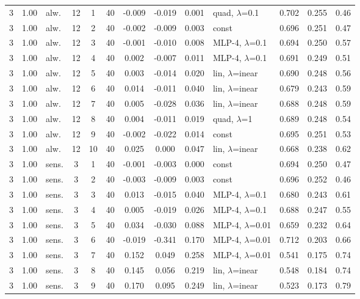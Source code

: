 \documentclass[10pt]{article}
\begin{document}
\begin{scriptsize}
\begin{longtable}{cclcc c ccc l ccc}
3 & 1.00 & alw. & 12 & 1 & 40 & -0.009 & -0.019 & 0.001 & quad, $\lambda$=0.1 & 0.702 & 0.255 & 0.46 \\
3 & 1.00 & alw. & 12 & 2 & 40 & -0.002 & -0.009 & 0.003 & const & 0.696 & 0.251 & 0.47 \\
3 & 1.00 & alw. & 12 & 3 & 40 & -0.001 & -0.010 & 0.008 & MLP-4, $\lambda$=0.1 & 0.694 & 0.250 & 0.57 \\
3 & 1.00 & alw. & 12 & 4 & 40 & 0.002 & -0.007 & 0.011 & MLP-4, $\lambda$=0.1 & 0.691 & 0.249 & 0.51 \\
3 & 1.00 & alw. & 12 & 5 & 40 & 0.003 & -0.014 & 0.020 & lin, $\lambda$=inear & 0.690 & 0.248 & 0.56 \\
3 & 1.00 & alw. & 12 & 6 & 40 & 0.014 & -0.011 & 0.040 & lin, $\lambda$=inear & 0.679 & 0.243 & 0.59 \\
3 & 1.00 & alw. & 12 & 7 & 40 & 0.005 & -0.028 & 0.036 & lin, $\lambda$=inear & 0.688 & 0.248 & 0.59 \\
3 & 1.00 & alw. & 12 & 8 & 40 & 0.004 & -0.011 & 0.019 & quad, $\lambda$=1 & 0.689 & 0.248 & 0.54 \\
3 & 1.00 & alw. & 12 & 9 & 40 & -0.002 & -0.022 & 0.014 & const & 0.695 & 0.251 & 0.53 \\
3 & 1.00 & alw. & 12 & 10 & 40 & 0.025 & 0.000 & 0.047 & lin, $\lambda$=inear & 0.668 & 0.238 & 0.62 \\
3 & 1.00 & sens. & 3 & 1 & 40 & -0.001 & -0.003 & 0.000 & const & 0.694 & 0.250 & 0.47 \\
3 & 1.00 & sens. & 3 & 2 & 40 & -0.003 & -0.009 & 0.003 & const & 0.696 & 0.252 & 0.46 \\
3 & 1.00 & sens. & 3 & 3 & 40 & 0.013 & -0.015 & 0.040 & MLP-4, $\lambda$=0.1 & 0.680 & 0.243 & 0.61 \\
3 & 1.00 & sens. & 3 & 4 & 40 & 0.005 & -0.019 & 0.026 & MLP-4, $\lambda$=0.1 & 0.688 & 0.247 & 0.55 \\
3 & 1.00 & sens. & 3 & 5 & 40 & 0.034 & -0.030 & 0.088 & MLP-4, $\lambda$=0.01 & 0.659 & 0.232 & 0.64 \\
3 & 1.00 & sens. & 3 & 6 & 40 & -0.019 & -0.341 & 0.170 & MLP-4, $\lambda$=0.01 & 0.712 & 0.203 & 0.66 \\
3 & 1.00 & sens. & 3 & 7 & 40 & 0.152 & 0.049 & 0.258 & MLP-4, $\lambda$=0.01 & 0.541 & 0.175 & 0.74 \\
3 & 1.00 & sens. & 3 & 8 & 40 & 0.145 & 0.056 & 0.219 & lin, $\lambda$=inear & 0.548 & 0.184 & 0.74 \\
3 & 1.00 & sens. & 3 & 9 & 40 & 0.170 & 0.095 & 0.249 & lin, $\lambda$=inear & 0.523 & 0.173 & 0.79 \\

\end{longtable}
\end{scriptsize}
\end{document}
